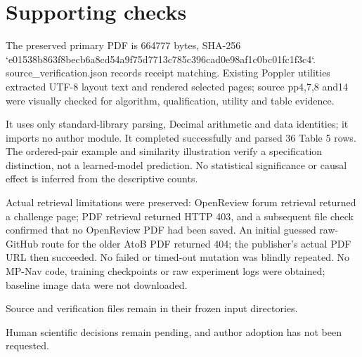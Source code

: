 \documentclass[10pt]{article}
\begin{document}
\section*{Supporting checks}
The preserved primary PDF is 664777 bytes, SHA-256 `e01538b863f8becb6a8cd54a9f75d7713c785c396cad0e98af1c0bc01fc1f3c4`. source\_verification.json records receipt matching. Existing Poppler utilities extracted UTF-8 layout text and rendered selected pages; source pp4,7,8 and14 were visually checked for algorithm, qualification, utility and table evidence.\par
It uses only standard-library parsing, Decimal arithmetic and data identities; it imports no author module. It completed successfully and parsed 36 Table 5 rows. The ordered-pair example and similarity illustration verify a specification distinction, not a learned-model prediction. No statistical significance or causal effect is inferred from the descriptive counts.\par
Actual retrieval limitations were preserved: OpenReview forum retrieval returned a challenge page; PDF retrieval returned HTTP 403, and a subsequent file check confirmed that no OpenReview PDF had been saved. An initial guessed raw-GitHub route for the older AtoB PDF returned 404; the publisher’s actual PDF URL then succeeded. No failed or timed-out mutation was blindly repeated. No MP-Nav code, training checkpoints or raw experiment logs were obtained; baseline image data were not downloaded.\par
Source and verification files remain in their frozen input directories.\par
Human scientific decisions remain pending, and author adoption has not been requested.\par
\end{document}
